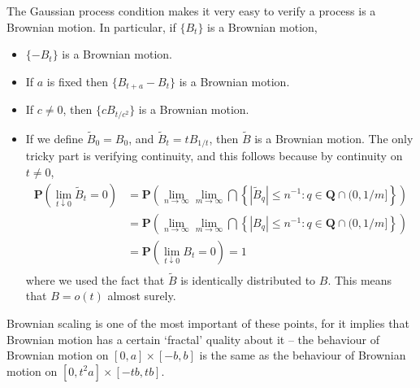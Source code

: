 The Gaussian process condition makes it very easy to verify a process is a Brownian motion. In particular, if $\{ B_t \}$ is a Brownian motion,
%
\begin{itemize}
    \item $\{ -B_t \}$ is a Brownian motion.
    \item If $a$ is fixed then $\{ B_{t+a} - B_t \}$ is a Brownian motion.
    \item If $c \neq 0$, then $\{ cB_{t/c^2} \}$ is a Brownian motion.
    \item If we define $\tilde{B}_0 = B_0$, and $\tilde{B}_t = tB_{1/t}$, then $\tilde{B}$ is a Brownian motion. The only tricky part is verifying continuity, and this follows because by continuity on $t \neq 0$,
    \begin{align*}
        \mathbf{P} \left( \lim_{t \downarrow 0} \tilde{B}_t = 0 \right) &= \mathbf{P} \left( \lim_{n \to \infty} \lim_{m \to \infty} \bigcap \left\{ |\tilde{B}_q| \leq n^{-1} : q \in \mathbf{Q} \cap (0,1/m] \right\} \right)\\
        &= \mathbf{P} \left( \lim_{n \to \infty} \lim_{m \to \infty} \bigcap \left\{ |B_q| \leq n^{-1} : q \in \mathbf{Q} \cap (0,1/m] \right\} \right)\\
        &= \mathbf{P} \left( \lim_{t \downarrow 0} B_t = 0 \right) = 1\\
    \end{align*}
    where we used the fact that $\tilde{B}$ is identically distributed to $B$. This means that $B = o(t)$ almost surely.
\end{itemize}

Brownian scaling is one of the most important of these points, for it implies that Brownian motion has a certain `fractal' quality about it -- the behaviour of Brownian motion on $[0,a] \times [-b,b]$ is the same as the behaviour of Brownian motion on $[0,t^2a] \times [-tb, tb]$.

